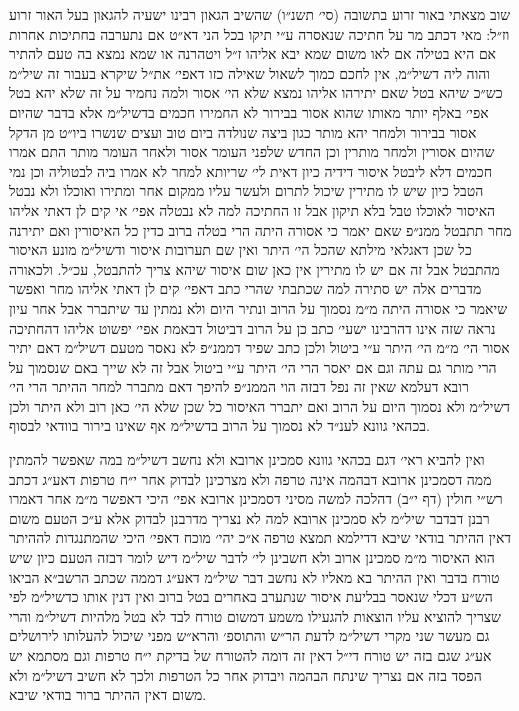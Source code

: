 \documentclass[12pt, openany]{book}
\begin{document}
\begin{multicols}{2}
שוב מצאתי באור זרוע בתשובה (סי׳ תשנ״ו) שהשיב הגאון רבינו ישעיה להגאון בעל האור זרוע וז״ל: מאי דכתב מר על חתיכה שנאסרה ע״י תיקו בכל הני דא״ט אם נתערבה בחתיכות אחרות אם היא בטילה אם לאו משום שמא יבא אליהו ז״ל ויטהרנה או שמא נמצא בה טעם להתיר והוה ליה דשיל״מ, אין לחכם כמוך לשאול שאילה כזו דאפי׳ את״ל שיקרא בעבור זה שיל״מ כש״כ שיהא בטל שאם יתירהו אליהו נמצא שלא הי׳ אסור ולמה נחמיר על זה שלא יהא בטל אפי׳ באלף יותר מאותו שהוא אסור בבירור לא החמירו חכמים בדשיל״מ אלא בדבר שהיום אסור בבירור ולמחר יהא מותר כגון ביצה שנולדה ביום טוב ועצים שנשרו ביו״ט מן הדקל שהיום אסורין ולמחר מותרין וכן החדש שלפני העומר אסור ולאחר העומר מותר התם אמרו חכמים דלא ליבטל איסור דידיה כיון דאית לי׳ שריותא למחר לא אמרו ביה לבטוליה וכן נמי הטבל כיון שיש לו מתירין שיכול לתרום ולעשר עליו ממקום אחר ומתירו ואוכלו ולא נבטל האיסור לאוכלו טבל בלא תיקון אבל זו החתיכה למה לא נבטלה אפי׳ אי קים לן דאתי אליהו מחר תתבטל ממנ״פ שאם יאמר כי אסורה היתה הרי בטלה ברוב כדין כל האיסורין ואם יתירנה כל שכן דאגלאי מילתא שהכל הי׳ היתר ואין שם תערובות איסור ודשיל״מ מונע האיסור מהתבטל אבל זה אם יש לו מתירין אין כאן שום איסור שיהא צריך להתבטל, עכ״ל. ולכאורה מדברים אלה יש סתירה למה שכתבתי שהרי כתב דאפי׳ קים לן דאתי אליהו מחר ואפשר שיאמר כי אסורה היתה מ״מ נסמוך על הרוב ונתיר היום ולא נמתין עד שיתברר אבל אחר עיון נראה שזה אינו דהרבינו ישעי׳ כתב כן על הרוב דביטול דבאמת אפי׳ יפשוט אליהו דהחתיכה אסור הי׳ מ״מ הי׳ היתר ע״י ביטול ולכן כתב שפיר דממנ״פ לא נאסר מטעם דשיל״מ דאם יתיר הרי מותר גם עתה וגם אם יאסר הרי הי׳ היתר ע״י ביטול אבל זה לא שייך באם שנסמוך על רובא דעלמא שאין זה נפל דבזה הוי הממנ״פ להיפך דאם מתברר למחר ההיתר הרי הי׳ דשיל״מ ולא נסמוך היום על הרוב ואם יתברר האיסור כל שכן שלא הי׳ כאן רוב ולא היתר ולכן בכהאי גוונא לענ״ד לא נסמוך על הרוב בדשיל״מ אף שאינו בירור בוודאי לבסוף.\\\vspace{0pt}

ואין להביא ראי׳ דגם בכהאי גוונא סמכינן ארובא ולא נחשב דשיל״מ במה שאפשר להמתין ממה דסמכינן ארובא דבהמה אינה טרפה ולא מצרכינן לבדוק אחר י״ח טרפות דאע״ג דכתב רש״י חולין (דף י״ב) דהלכה למשה מסיני דסמכינן ארובא אפי׳ היכי דאפשר מ״מ אחר דאמרו רבנן דבדבר שיל״מ לא סמכינן ארובא למה לא נצריך מדרבנן לבדוק אלא ע״כ הטעם משום דאין ההיתר בודאי שיבא דדילמא תמצא טרפה א״כ יהי׳ מוכח דאפי׳ היכי שהמתנגדות לההיתר הוא האיסור מ״מ סמכינן ארוב ולא חשבינן לי׳ לדבר שיל״מ דיש לומר דבזה הטעם כיון שיש טורח בדבר ואין ההיתר בא מאליו לא נחשב דבר שיל״מ דאע״ג דממה שכתב הרשב״א הביאו הש״ע דכלי שנאסר בבליעת איסור שנתערב באחרים בטל ברוב ואין דנין אותו כדשיל״מ לפי שצריך להוציא עליו הוצאות להגעילו משמע דמשום טורח לבד לא בטל מלהיות דשיל״מ והרי גם מעשר שני מקרי דשיל״מ לדעת הר״ש והתוספ׳ והרא״ש מפני שיכול להעלותו לירושלים אע״ג שגם בזה יש טורח די״ל דאין זה דומה להטורח של בדיקת י״ח טרפות וגם מסתמא יש הפסד בזה אם נצריך שינתח הבהמה ויבדוק אחר כל הטרפות ולכך לא חשיב דשיל״מ ולא משום דאין ההיתר ברור בודאי שיבא.\\\vspace{0pt}


\end{multicols}
\end{document}
